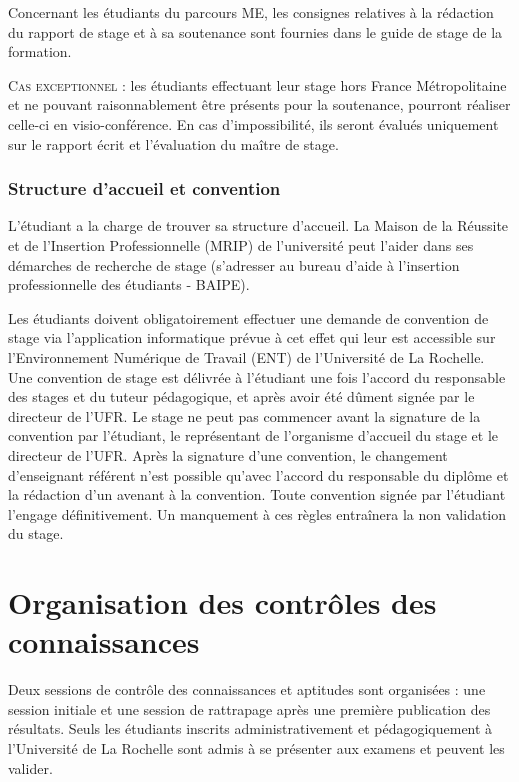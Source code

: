 \documentclass[a4paper,11pt]{article}
\begin{document}
Concernant les étudiants du parcours ME, les consignes relatives à la rédaction du rapport de stage et à sa soutenance sont fournies dans le guide de stage de la formation.

\textsc{Cas exceptionnel} : les étudiants effectuant leur stage hors France Métropolitaine et ne pouvant raisonnablement être présents pour la soutenance, pourront réaliser celle-ci en visio-conférence. En cas d'impossibilité, ils seront évalués uniquement sur le rapport écrit et l'évaluation du maître de stage.

\subsubsection{Structure d'accueil et convention}

L'étudiant a la charge de trouver sa structure d'accueil. La Maison de la Réussite et de l'Insertion Professionnelle (MRIP) de l'université peut l'aider dans ses démarches de recherche de stage (s'adresser au bureau d'aide à l'insertion professionnelle des étudiants - BAIPE).

Les étudiants doivent obligatoirement effectuer une demande de convention de stage via l'application informatique prévue à cet effet qui leur est accessible sur l'Environnement Numérique de Travail (ENT) de l'Université de La Rochelle.
Une convention de stage est délivrée à l'étudiant une fois l'accord du responsable des stages et du tuteur pédagogique, et après avoir été dûment signée par le directeur de l'UFR.
Le stage ne peut pas commencer avant la signature de la convention par l'étudiant, le représentant de l'organisme d'accueil du stage et le directeur de l'UFR. Après la signature d'une convention, le changement d'enseignant référent n'est possible qu'avec l'accord du responsable du diplôme et la rédaction d'un avenant à la convention.
Toute convention signée par l'étudiant l'engage définitivement. Un manquement à ces règles entraînera la non validation du stage.


\section{Organisation des contrôles des connaissances}\label{cc}

Deux sessions de contrôle des connaissances et aptitudes sont organisées : une session initiale et une session de rattrapage après une première publication des résultats. Seuls les étudiants inscrits administrativement et pédagogiquement à l'Université de La Rochelle sont admis à se présenter aux examens et peuvent les valider.
\end{document}
